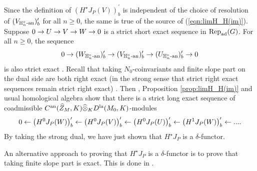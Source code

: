 \documentclass[10pt]{amsart}
\begin{document}
Since the definition of $\left(H^{\star}J_{P}(V)\right)^{\prime}_{b}$ is independent of the choice of resolution of $(V_{\mathbb{H}_{n}^{\circ}\textnormal{-an}})^{\prime}_{b}$ for all $n\geq 0$, the same is true of the source of (\ref{eqn:limH_H(im)}). Suppose $0\rightarrow U \rightarrow V \rightarrow W \rightarrow 0$ is a strict short exact sequence in $\textnormal{Rep}_{\textnormal{ad}}(G)$. For all $n\geq 0$, the sequence \begin{equation*}
    0 \rightarrow (W_{\mathbb{H}_{n}^{\circ}\textnormal{-an}})^{\prime}_{b} \rightarrow (V_{\mathbb{H}_{n}^{\circ}\textnormal{-an}})^{\prime}_{b} \rightarrow (U_{\mathbb{H}_{n}^{\circ}\textnormal{-an}})^{\prime}_{b} \rightarrow 0
\end{equation*} is also strict exact \cite[Cor. 1.4]{ST_GL2} \cite[Thm. 1, p. IV.28]{Bourbaki} \cite[Cor. A.13]{Jacquet2}. Recall that taking $N_{0}$-coinvariants and finite slope part on the dual side are both right exact (in the strong sense that strict right exact sequences remain strict right exact) \cite[Prop. 3.2.6]{Jacquet1}. Then \cite[Thm. B]{ST_dist}, Proposition \ref{prop:limH_H(im)} and usual homological algebra show that there is a strict long exact sequence of coadmissible $C^{\textnormal{an}}(\widehat{Z}_{M},K)\widehat{\otimes}_{K}D^{\textnormal{la}}(M_{0},K)$-modules \begin{equation*}
    0 \leftarrow \left(H^{0}J_{P}(W)\right)^{\prime}_{b} \leftarrow \left(H^{0}J_{P}(V)\right)^{\prime}_{b} \leftarrow \left(H^{0}J_{P}(U)\right)^{\prime}_{b} \leftarrow \left(H^{1}J_{P}(W)\right)^{\prime}_{b} \leftarrow ....
\end{equation*} By taking the strong dual, we have just shown that $H^{\star}J_{P}$ is a $\delta$-functor. 

\begin{remark}
An alternative approach to proving that $H^{\star}J_{P}$ is a $\delta$-functor is to prove that taking finite slope part is exact. This is done in \cite[Thm. 4.5]{Weibo}.

\end{remark}
\end{document}
